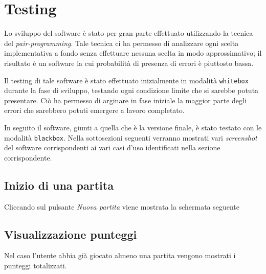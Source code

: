 \section{Testing}
        Lo sviluppo del software è stato per gran parte effettuato utilizzando la tecnica del \emph{pair-programming}.
        Tale tecnica ci ha permesso di analizzare ogni scelta implementativa a fondo senza effettuare nessuna scelta in modo approssimativo; il risultato è un software la cui probabilità di presenza di errori è piuttosto bassa.
        
        Il testing di tale software è stato effettuato inizialmente in modalità \texttt{whitebox} durante la fase di sviluppo, testando ogni condizione limite che si sarebbe potuta presentare.
        Ciò ha permesso di arginare in fase iniziale la maggior parte degli errori che sarebbero potuti emergere a lavoro completato.
        
        \vspace{0.3cm}
        In seguito il software, giunti a quella che è la versione finale, è stato testato con le modalità \texttt{blackbox}.
        Nella sottosezioni seguenti verranno mostrati vari \emph{screenshot} del software corrispondenti ai vari casi d'uso identificati nella sezione corrispondente.
    
        \newpage
        \subsection{Inizio di una partita}
            \begin{figure}[h!]
            \end{figure}
            Cliccando sul pulsante \emph{Nuova partita} viene mostrata la schermata seguente
            \begin{figure}[h!]
            \end{figure}
        
        \newpage
        \subsection{Visualizzazione punteggi}
            Nel caso l'utente abbia già giocato almeno una partita vengono mostrati i punteggi totalizzati.
            \begin{figure}[h!]
            \end{figure}
            
